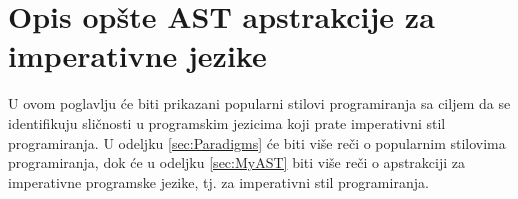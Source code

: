 \chapter{Opis opšte AST apstrakcije za imperativne jezike}
\label{chp:MyAST}

U ovom poglavlju će biti prikazani popularni stilovi programiranja sa ciljem da se identifikuju sličnosti u programskim jezicima koji prate imperativni stil programiranja. U odeljku \ref{sec:Paradigms} će biti više reči o popularnim stilovima programiranja, dok će u odeljku \ref{sec:MyAST} biti više reči o apstrakciji za imperativne programske jezike, tj. za imperativni stil programiranja.



